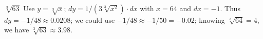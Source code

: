 {$\sqrt[3]{63}$
}
{Use $y = \sqrt[3]{x}$; $dy = 1/(3\sqrt[3]{x^2})\cdot dx$ with $x=64$ and $dx = -1$. Thus $dy = -1/48\approx 0.0208$; we could use $-1/48\approx -1/50=-0.02$; knowing $\sqrt[3]{64}=4$, we have $\sqrt[3]{63} \approx 3.98$.
}

